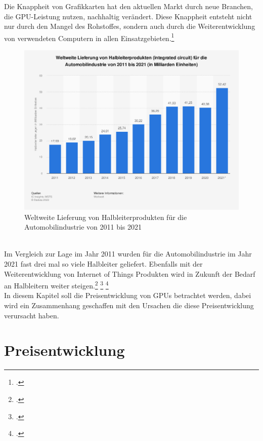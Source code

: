 \documentclass[12pt,toc=bib,toc=listof]{scrreprt}
\begin{document}
Die Knappheit von Grafikkarten hat den
aktuellen Markt durch neue Branchen, die GPU-Leistung nutzen, nachhaltig verändert.
Diese Knappheit entsteht nicht nur durch den Mangel des Rohstoffes, sondern auch durch die 
Weiterentwicklung von verwendeten Computern in allen Einsatzgebieten.\footcite [Vgl.] []{Voas.2021}
\\
\begin{figure}[h]
  \centering
  \includegraphics[scale=0.35]{Abbildungen/Martin_Kords_1.png} %
  \caption[M. Kords (2022)] {Weltweite Lieferung von Halbleiterprodukten für die Automobilindustrie von 2011 bis 2021}
\end{figure}
\\
Im Vergleich zur Lage im Jahr 2011 wurden für die Automobilindustrie im Jahr 2021 fast drei mal so viele
Halbleiter geliefert. Ebenfalls mit der Weiterentwicklung von Internet of Things Produkten wird in
Zukunft der Bedarf an Halbleitern weiter steigen.\footcite [Vgl.] []{Bill_McClean} \footcite [Vgl.] []{Voas.2021} \footcite [Vgl.] {Kords.2022}
\\In diesem Kapitel soll die Preisentwicklung von GPUs betrachtet werden, dabei wird 
ein Zusammenhang geschaffen mit den Ursachen die diese Preisentwicklung 
verursacht haben.
\\

\section{Preisentwicklung}
\label{sec:Preisentwicklung}
\end{document}
